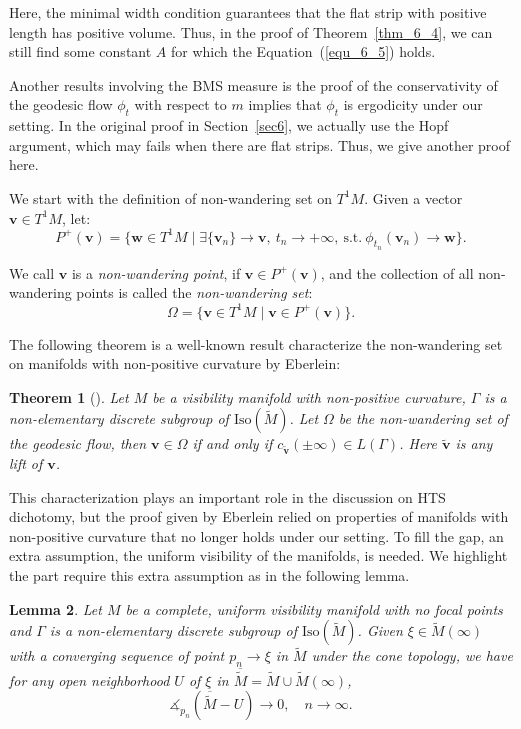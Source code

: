 \documentclass[reqno,11pt]{article}
\newtheorem{theorem}{Theorem}[section]
\newtheorem{lemma}[theorem]{Lemma}
\theoremstyle{definition}
\theoremstyle{remark}
\numberwithin{equation}{section}
\begin{document}
Here, the minimal width condition guarantees that the flat strip with positive length has positive volume. Thus, in the proof of Theorem~\ref{thm_6_4}, we can still find some constant $A$ for which the Equation~(\ref{equ_6_5}) holds.

Another results involving the BMS measure is the proof of the conservativity of the geodesic flow $\phi_t$ with respect to $m$ implies that $\phi_t$ is ergodicity under our setting. In the original proof in Section~\ref{sec6}, we actually use the Hopf argument, which may fails when there are flat strips. Thus, we give another proof here.   

We start with the definition of non-wandering set on $T^1M$. Given a vector $\bm{v}\in T^1M$, let:
\begin{displaymath}
	P^{+}(\bm{v})=\{\bm{w}\in T^1M\mid \exists \{\bm{v}_n\}\to\bm{v},~t_n\to +\infty,~\text{s.t.}~\phi_{t_n}(\bm{v}_n)\to\bm{w}\}.
\end{displaymath}

We call $\bm{v}$ is a \emph{non-wandering point}, if $\bm{v}\in P^{+}(\bm{v})$, and the collection of all non-wandering points is called the \emph{non-wandering set}:
\begin{displaymath}
	\Omega=\{\bm{v}\in T^1M\mid \bm{v}\in P^{+}(\bm{v})\}.
\end{displaymath}

The following theorem is a well-known result characterize the non-wandering set on manifolds with non-positive curvature by Eberlein:

\begin{theorem}[\cite{Eb2}]\label{thm_7_2}
    Let $M$ be a visibility manifold with non-positive curvature, $\Gamma$ is a non-elementary discrete subgroup of $\text{Iso}(\widetilde{M})$. Let $\Omega$ be the non-wandering set of the geodesic flow, then $\bm{v}\in\Omega$ if and only if $c_{\bm{\widetilde{v}}}(\pm\infty)\in L(\Gamma)$. Here $\bm{\widetilde{v}}$ is any lift of $\bm{v}$.
\end{theorem}

This characterization plays an important role in the discussion on HTS dichotomy, but the proof given by Eberlein relied on properties of manifolds with non-positive curvature that no longer holds under our setting. To fill the gap, an extra assumption, the uniform visibility of the manifolds, is needed. We highlight the part require this extra assumption as in the following lemma.

\begin{lemma}\label{lem_7_3}
	Let $M$ be a complete, uniform visibility manifold with no focal points and $\Gamma$ is a non-elementary discrete subgroup of $\text{Iso}(\widetilde{M})$. Given $\xi\in\widetilde{M}(\infty)$ with a converging sequence of point $p_n\to\xi$ in $\widetilde{M}$ under the cone topology, we have for any open neighborhood $U$ of $\xi$ in $\overline{\widetilde{M}}=\widetilde{M}\cup\widetilde{M}(\infty)$,
	\begin{displaymath}
		\measuredangle_{p_n}(\overline{\widetilde{M}}-U)\to 0,\quad n\to\infty.
	\end{displaymath}
\end{lemma}
\end{document}
